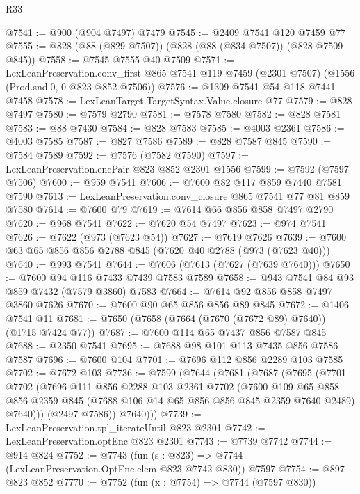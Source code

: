 \begin{lexlean}{R33}
\begin{coremodule}
@7541 := @900 (@904 @7497) @7479
@7545 := @2409 @7541 @120 @7459 @77
@7555 := @828 (@88 (@829 @7507)) (@828 (@88 (@834 @7507)) (@828 @7509 @845))
@7558 := @7545 @7555 @40 @7509
@7571 := LexLeanPreservation.conv_first
    @865
    @7541
    @119
    @7459
    (@2301 @7507)
    (@1556 (Prod.snd.{0, 0} @823 @852 @7506))
@7576 := @1309 @7541 @54 @118 @7441 @7458
@7578 := LexLeanTarget.TargetSyntax.Value.closure @77
@7579 := @828 @7497
@7580 := @7579 @2790
@7581 := @7578 @7580
@7582 := @828 @7581
@7583 := @88 @7430
@7584 := @828 @7583
@7585 := @4003 @2361
@7586 := @4003 @7585
@7587 := @827 @7586
@7589 := @828 @7587 @845
@7590 := @7584 @7589
@7592 := @7576 (@7582 @7590)
@7597 := LexLeanPreservation.encPair @823 @852 @2301 @1556
@7599 := @7592 (@7597 @7506)
@7600 := @959 @7541
@7606 := @7600 @82 @117 @859 @7440 @7581 @7590
@7613 := LexLeanPreservation.conv_closure @865 @7541 @77 @81 @859 @7580
@7614 := @7600 @79
@7619 := @7614 @66 @856 @858 @7497 @2790
@7620 := @968 @7541
@7622 := @7620 @54 @7497
@7623 := @974 @7541
@7626 := @7622 (@973 (@7623 @54))
@7627 := @7619 @7626
@7639 := @7600 @63 @65 @856 @856 @2788 @845 (@7620 @40 @2788 (@973 (@7623 @40)))
@7640 := @993 @7541
@7644 := @7606 (@7613 (@7627 (@7639 @7640)))
@7650 := @7600 @94 @116 @7433 @7439 @7583 @7589
@7658 := @943 @7541 @84 @93 @859 @7432 (@7579 @3860) @7583
@7664 := @7614 @92 @856 @858 @7497 @3860 @7626
@7670 := @7600 @90 @65 @856 @856 @89 @845
@7672 := @1406 @7541 @11
@7681 := @7650 (@7658 (@7664 (@7670 (@7672 @89) @7640)) (@1715 @7424 @77))
@7687 := @7600 @114 @65 @7437 @856 @7587 @845
@7688 := @2350 @7541
@7695 := @7688 @98 @101 @113 @7435 @856 @7586 @7587
@7696 := @7600 @104
@7701 := @7696 @112 @856 @2289 @103 @7585
@7702 := @7672 @103
@7736 := @7599
    (@7644
      (@7681
        (@7687
          (@7695
            (@7701
              @7702
              (@7696
                @111
                @856
                @2288
                @103
                @2361
                @7702
                (@7600
                  @109
                  @65
                  @858
                  @856
                  @2359
                  @845
                  (@7688 @106 @14 @65 @856 @856 @845 @2359 @7640 @2489)
                  @7640)))
            (@2497 @7586))
          @7640)))
@7739 := LexLeanPreservation.tpl_iterateUntil @823 @2301
@7742 := LexLeanPreservation.optEnc @823 @2301
@7743 := @7739 @7742
@7744 := @914 @824
@7752 := @7743 (fun (s : @823) => @7744 (LexLeanPreservation.OptEnc.elem @823 @7742 @830)) @7597
@7754 := @897 @823 @852
@7770 := @7752
    (fun (x : @7754) => @7744 (@7597 @830))

\end{coremodule}
\end{lexlean}

